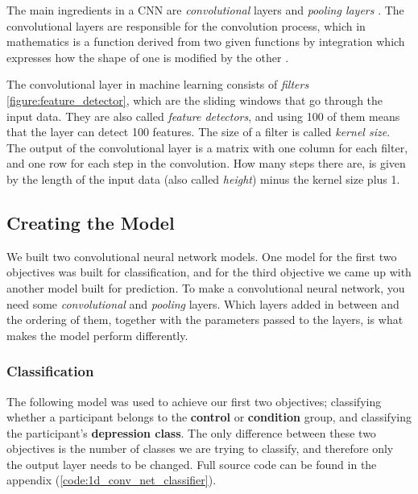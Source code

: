 \noindent The main ingredients in a CNN are \textit{convolutional} layers and \textit{pooling layers} \cite{deep_learning}. The convolutional layers are responsible for the convolution process, which in mathematics is a function derived from two given functions by integration which expresses how the shape of one is modified by the other \cite{convolution_definition}. 

The convolutional layer in machine learning consists of \textit{filters} \ref{figure:feature_detector}, which are the sliding windows that go through the input data.  They are also called \textit{feature detectors}, and using 100 of them means that the layer can detect 100 features. The size of a filter is called \textit{kernel size}. The output of the convolutional layer is a matrix with one column for each filter, and one row for each step in the convolution. How many steps there are, is given by the length of the input data (also called \textit{height}) minus the kernel size plus 1.

\subsection{Creating the Model}
We built two convolutional neural network models. One model for the first two objectives was built for classification, and for the third objective we came up with another model built for prediction. To make a convolutional neural network, you need some \textit{convolutional} and \textit{pooling} layers. Which layers added in between and the ordering of them, together with the parameters passed to the layers, is what makes the model perform differently. 

\subsubsection{Classification}
The following model was used to achieve our first two objectives; classifying whether a participant belongs to the \textbf{control} or \textbf{condition} group, and classifying the participant's \textbf{depression class}. The only difference between these two objectives is the number of classes we are trying to classify, and therefore only the output layer needs to be changed. Full source code can be found in the appendix (\ref{code:1d_conv_net_classifier}).

